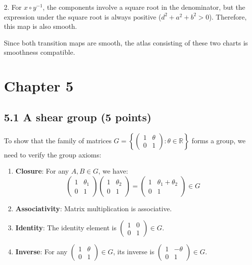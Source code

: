 \documentclass{article}
\begin{document}
2. For $x \circ y^{-1}$, the components involve a square root in the denominator, but the expression under the square root is always positive ($d^2 + a^2 + b^2 > 0$). Therefore, this map is also smooth.

Since both transition maps are smooth, the atlas consisting of these two charts is smoothness compatible.

\newpage
\section{Chapter 5}

\subsection*{5.1 A shear group (5 points)}

To show that the family of matrices $G = \left\{\begin{pmatrix} 1 & \theta \\ 0 & 1 \end{pmatrix} : \theta \in \mathbb{R}\right\}$ forms a group, we need to verify the group axioms:

\begin{enumerate}
    \item \textbf{Closure}: For any $A, B \in G$, we have:
    \[
    \begin{pmatrix} 1 & \theta_1 \\ 0 & 1 \end{pmatrix} \begin{pmatrix} 1 & \theta_2 \\ 0 & 1 \end{pmatrix} = \begin{pmatrix} 1 & \theta_1 + \theta_2 \\ 0 & 1 \end{pmatrix} \in G
    \]
    
    \item \textbf{Associativity}: Matrix multiplication is associative.
    
    \item \textbf{Identity}: The identity element is $\begin{pmatrix} 1 & 0 \\ 0 & 1 \end{pmatrix} \in G$.
    
    \item \textbf{Inverse}: For any $\begin{pmatrix} 1 & \theta \\ 0 & 1 \end{pmatrix} \in G$, its inverse is $\begin{pmatrix} 1 & -\theta \\ 0 & 1 \end{pmatrix} \in G$.
\end{enumerate}
\end{document}
